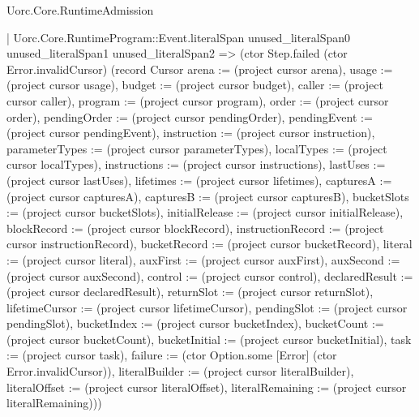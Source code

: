 \begin{lexlean}{Uorc.Core.RuntimeAdmission}
\begin{semanticmodule}
{          | Uorc.Core.RuntimeProgram::Event.literalSpan unused_literalSpan0 unused_literalSpan1 unused_literalSpan2 => (ctor Step.failed (ctor Error.invalidCursor) (record Cursor {arena := (project cursor arena), usage := (project cursor usage), budget := (project cursor budget), caller := (project cursor caller), program := (project cursor program), order := (project cursor order), pendingOrder := (project cursor pendingOrder), pendingEvent := (project cursor pendingEvent), instruction := (project cursor instruction), parameterTypes := (project cursor parameterTypes), localTypes := (project cursor localTypes), instructions := (project cursor instructions), lastUses := (project cursor lastUses), lifetimes := (project cursor lifetimes), capturesA := (project cursor capturesA), capturesB := (project cursor capturesB), bucketSlots := (project cursor bucketSlots), initialRelease := (project cursor initialRelease), blockRecord := (project cursor blockRecord), instructionRecord := (project cursor instructionRecord), bucketRecord := (project cursor bucketRecord), literal := (project cursor literal), auxFirst := (project cursor auxFirst), auxSecond := (project cursor auxSecond), control := (project cursor control), declaredResult := (project cursor declaredResult), returnSlot := (project cursor returnSlot), lifetimeCursor := (project cursor lifetimeCursor), pendingSlot := (project cursor pendingSlot), bucketIndex := (project cursor bucketIndex), bucketCount := (project cursor bucketCount), bucketInitial := (project cursor bucketInitial), task := (project cursor task), failure := (ctor Option.some [Error] (ctor Error.invalidCursor)), literalBuilder := (project cursor literalBuilder), literalOffset := (project cursor literalOffset), literalRemaining := (project cursor literalRemaining)}))
}
\end{semanticmodule}
\end{lexlean}
